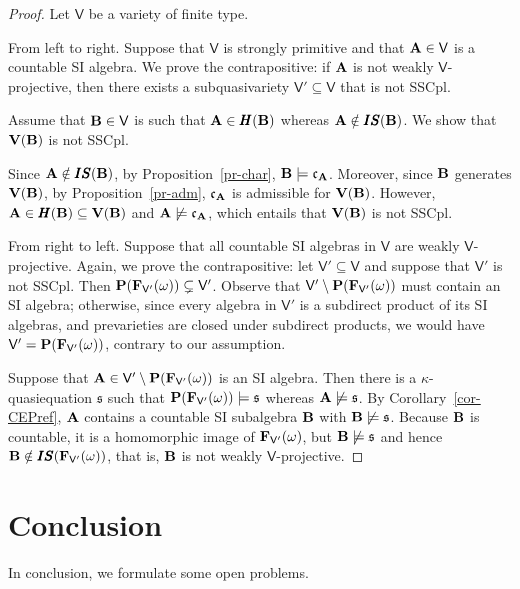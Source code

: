 \documentclass[submission,copyright,creativecommons]{eptcs}
\theoremstyle{definition}
\newcommand{\alg}[1]{{{\textbf{\upshape #1}}}}
\newcommand{\VV}{\mathbf{V}}
\newcommand{\PR}{\mathbf{P}}
\newcommand{\SU}{\pmb{S}}
\newcommand{\II}{\pmb{I}}
\newcommand{\HH}{\pmb{H}}
\newcommand{\vv}[1]{\mathsf {#1}}
\newcommand{\kk}{\kappa}
\newcommand{\sq}{\mathfrak{s}}
\newcommand{\csq}{\mathfrak{c}}
\begin{document}
\begin{proof}
	Let $\vv V$ be a variety of finite type.
	
	From left to right. Suppose that $\vv V$ is strongly primitive and that $\alg A \in \vv V$ is a countable SI algebra. We prove the contrapositive: if $\alg A$ is not weakly $\vv V$-projective, then there exists a subquasivariety $\vv V' \subseteq \vv V$ that is not SSCpl.
	
	Assume that $\alg B \in \vv V$ is such that $\alg A \in \HH(\alg B)$ whereas $\alg A \notin \II\SU(\alg B)$. We show that $\VV(\alg B)$ is not SSCpl.
	
	Since $\alg A \notin \II\SU(\alg B)$, by Proposition~\ref{pr-char}, $\alg B \models \csq_\alg A$. Moreover, since $\alg B$ generates $\VV(\alg B)$, by Proposition~\ref{pr-adm}, $\csq_\alg A$ is admissible for $\VV(\alg B)$. However, $\alg A \in \HH(\alg B) \subseteq \VV(\alg B)$ and $\alg A \not\models \csq_\alg A$, which entails that $\VV(\alg B)$ is not SSCpl.
	
	From right to left. Suppose that all countable SI algebras in $\vv V$ are weakly $\vv V$-projective. Again, we prove the contrapositive: let $\vv V' \subseteq \vv V$ and suppose that $\vv V'$ is not SSCpl. Then $\PR(\alg F_{\vv V'}(\omega)) \subsetneq \vv V'$. Observe that $\vv V' \setminus \PR(\alg F_{\vv V'}(\omega))$ must contain an SI algebra; otherwise, since every algebra in $\vv V'$ is a subdirect product of its SI algebras, and prevarieties are closed under subdirect products, we would have $\vv V' = \PR(\alg F_{\vv V'}(\omega))$, contrary to our assumption.
	
	Suppose that $\alg A \in \vv V' \setminus \PR(\alg F_{\vv V'}(\omega))$ is an SI algebra. Then there is a $\kk$-quasiequation $\sq$ such that $\PR(\alg F_{\vv V'}(\omega)) \models \sq$ whereas $\alg A \not\models \sq$. By Corollary~\ref{cor-CEPref}, $\alg A$ contains a countable SI subalgebra $\alg B$ with $\alg B \not\models \sq$. Because $\alg B$ is countable, it is a homomorphic image of $\alg F_{\vv V'}(\omega)$, but $\alg B \not\models \sq$ and hence $\alg B \notin \II\SU(\alg F_{\vv V'}(\omega))$, that is, $\alg B$ is not weakly $\vv V$-projective.
\end{proof}

\section{Conclusion}

In conclusion, we formulate some open problems.
\end{document}

